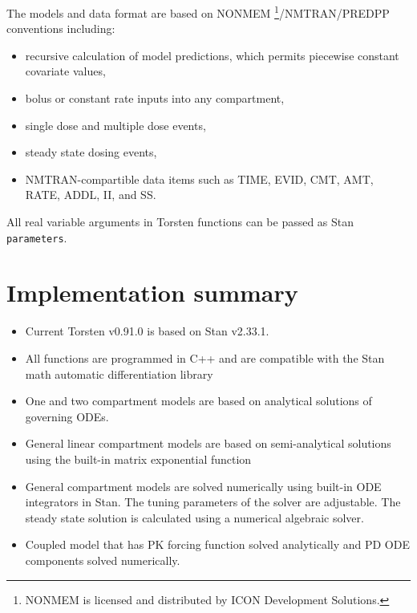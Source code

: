 \documentclass[12pt, reqno, oneside]{amsbook}
\numberwithin{equation}{chapter}
\numberwithin{figure}{chapter}
\numberwithin{table}{chapter}
\theoremstyle{remark}
\begin{document}
The models and data format are based on
NONMEM \textregistered{} \footnote{NONMEM\textregistered{} is licensed and distributed by ICON Development Solutions.}/NMTRAN/PREDPP
conventions including:
\begin{itemize}
\item recursive calculation of model predictions, which permits piecewise constant covariate values,
\item bolus or constant rate inputs into any compartment,
\item single dose and multiple dose events,
\item steady state dosing events,
\item NMTRAN-compartible data items such as TIME, EVID, CMT, AMT, RATE, ADDL, II, and SS.
\end{itemize}

All real variable arguments in Torsten functions can be passed as Stan \texttt{parameters}.

\section{Implementation summary}
\label{sec:orgabe7e42}
\begin{itemize}
\item Current Torsten v0.91.0 is based on Stan v2.33.1.
\item All functions are programmed in C++ and are compatible
with the Stan math automatic differentiation library \cite{carpenter15_stan_math_librar}
\item One and two compartment models are based on analytical solutions of governing ODEs.
\item General linear compartment models are based on semi-analytical solutions using the built-in matrix exponential function
\item General compartment models are solved numerically using built-in ODE integrators in Stan. The tuning parameters of the solver are adjustable. The steady state solution is calculated using a numerical algebraic solver.
\item Coupled model that has PK forcing function solved analytically and PD ODE components solved numerically.
\end{itemize}
\end{document}
